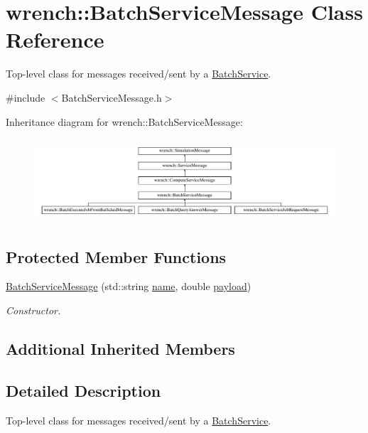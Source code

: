 \hypertarget{classwrench_1_1_batch_service_message}{}\section{wrench\+:\+:Batch\+Service\+Message Class Reference}
\label{classwrench_1_1_batch_service_message}


Top-\/level class for messages received/sent by a \hyperlink{classwrench_1_1_batch_service}{Batch\+Service}.  




{\ttfamily \#include $<$Batch\+Service\+Message.\+h$>$}

Inheritance diagram for wrench\+:\+:Batch\+Service\+Message\+:\begin{figure}[H]
\begin{center}
\leavevmode
\includegraphics[height=3.111111cm]{classwrench_1_1_batch_service_message}
\end{center}
\end{figure}
\subsection*{Protected Member Functions}
\begin{DoxyCompactItemize}
\item 
\hyperlink{classwrench_1_1_batch_service_message_ab41ad2c88e84ccf1335f364fd3beb7c9}{Batch\+Service\+Message} (std\+::string \hyperlink{classwrench_1_1_simulation_message_ab224f6dd8ec5ee2e7f65bfcdf2b8a86b}{name}, double \hyperlink{classwrench_1_1_simulation_message_a914f2732713f7c02898e66f05a7cb8a1}{payload})
\begin{DoxyCompactList}\small\item\em Constructor. \end{DoxyCompactList}\end{DoxyCompactItemize}
\subsection*{Additional Inherited Members}


\subsection{Detailed Description}
Top-\/level class for messages received/sent by a \hyperlink{classwrench_1_1_batch_service}{Batch\+Service}. 

